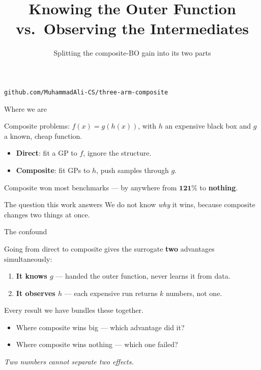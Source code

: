 \documentclass[aspectratio=169,11pt]{beamer}
\title{\bfseries Knowing the Outer Function vs.\ Observing the Intermediates}
\subtitle{Splitting the composite-BO gain into its two parts}
\date{}
\author{}
\begin{document}
\begin{frame}[plain]
\titlepage
\vfill
\small
\texttt{github.com/MuhammadAli-CS/three-arm-composite}
\end{frame}

\begin{frame}{Where we are}

Composite problems: $f(x)=g(h(x))$, with $h$ an expensive black box and $g$ a
known, cheap function.

\medskip
\begin{itemize}
\item \textbf{Direct}: fit a GP to $f$, ignore the structure.
\item \textbf{Composite}: fit GPs to $h$, push samples through $g$.
\end{itemize}

\medskip
Composite won most benchmarks --- by anywhere from $\mathbf{121\%}$ to
\textbf{nothing}.

\bigskip
\begin{block}{The question this work answers}
We do not know \emph{why} it wins, because composite changes two things at once.
\end{block}

\end{frame}

\begin{frame}{The confound}

Going from direct to composite gives the surrogate \textbf{two} advantages
simultaneously:

\bigskip
\begin{enumerate}
\item \textbf{It knows $g$} --- handed the outer function, never learns it from data.
\item \textbf{It observes $h$} --- each expensive run returns $k$ numbers, not one.
\end{enumerate}

\bigskip
Every result we have bundles these together.

\begin{itemize}
\item Where composite wins big --- which advantage did it?
\item Where composite wins nothing --- which one failed?
\end{itemize}

\bigskip
\centering
\emph{Two numbers cannot separate two effects.}

\end{frame}
\end{document}
